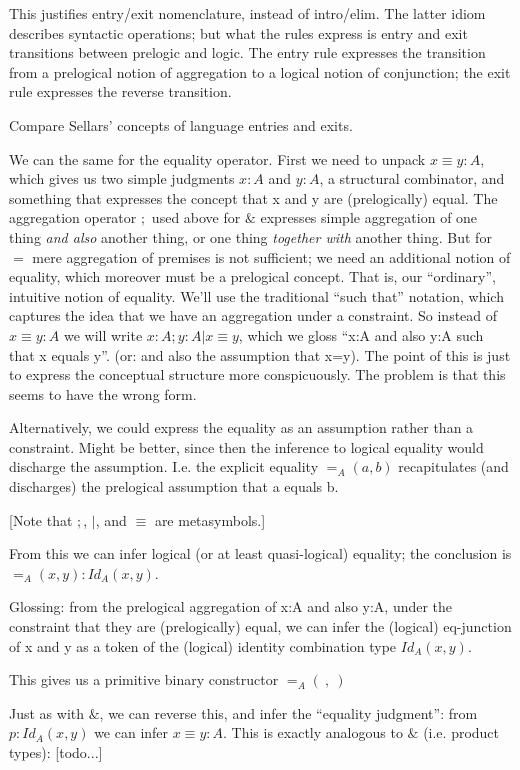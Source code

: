 \documentclass{article}
\begin{document}
This justifies entry/exit nomenclature, instead of intro/elim. The
latter idiom describes syntactic operations; but what the rules
express is entry and exit transitions between prelogic and logic. The
entry rule expresses the transition from a prelogical notion of
aggregation to a logical notion of conjunction; the exit rule expresses
the reverse transition.

Compare Sellars' concepts of language entries and exits.

We can the same for the equality operator. First we need to unpack \(x
≡ y : A\), which gives us two simple judgments \(x:A\) and \(y:A\), a
structural combinator, and something that expresses the concept that x
and y are (prelogically) equal. The aggregation operator \(;\) used
above for \(\&\) expresses simple aggregation of one thing \textit{and
  also} another thing, or one thing \textit{together with} another thing.
But for \(=\) mere aggregation of premises is not sufficient; we need
an additional notion of equality, which moreover must be a prelogical
concept. That is, our ``ordinary'', intuitive notion of equality.
We'll use the traditional ``such that'' notation, which captures the
idea that we have an aggregation under a constraint. So instead of \(x
≡ y : A\) we will write \(x:A ; y:A | x≡y\), which we gloss ``x:A and
also y:A such that x equals y''. (or: and also the assumption that
x=y). The point of this is just to express the conceptual structure
more conspicuously. The problem is that this seems to have the wrong
form.

Alternatively, we could express the equality as an assumption rather
than a constraint. Might be better, since then the inference to
logical equality would discharge the assumption. I.e. the explicit
equality \( =_A(a,b) \) recapitulates (and discharges) the prelogical
assumption that a equals b.

[Note that \(;\), \(|\), and \(≡\) are metasymbols.]

From this we can infer logical (or at least quasi-logical) equality;
the conclusion is \( =_A(x,y) : Id_A(x,y) \).

Glossing: from the prelogical aggregation of x:A and also y:A, under
the constraint that they are (prelogically) equal, we can infer the
(logical) eq-junction of x and y as a token of the (logical) identity
combination type \(Id_A(x,y)\).

This gives us a primitive binary constructor \( =_A(\ ,\ ) \)

Just as with \(\&\), we can reverse this, and infer the ``equality
judgment'': from \( p: Id_A(x,y) \) we can infer \(x ≡ y : A\). This
is exactly analogous to \(\&\) (i.e. product types): [todo...]
\end{document}

